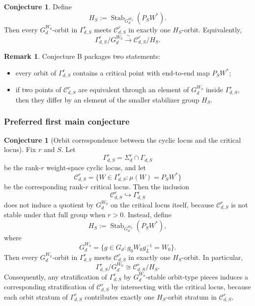 \documentclass{article}
\newcommand{\Stab}{\operatorname{Stab}}
\theoremstyle{definition}
\newtheorem{remark}[theorem]{Remark}
\newtheorem{conjecture}[theorem]{Conjecture}
\begin{document}
\begin{conjecture}
Define
\[
H_S:=\Stab_{G_d^{W_0}}(P_SW^\ast).
\]
Then every $G_d^{W_0}$-orbit in $\Gamma_{d,S}^r$ meets $\mathcal C_{d,S}^r$ in exactly one $H_S$-orbit. Equivalently,
\[
\Gamma_{d,S}^r / G_d^{W_0}
\xrightarrow{\ \sim\ }
\mathcal C_{d,S}^r / H_S.
\]
\end{conjecture}

\begin{remark}
Conjecture B packages two statements:
\begin{itemize}
\item every orbit of $\Gamma_{d,S}^r$ contains a critical point with end-to-end map $P_SW^\ast$;
\item if two points of $\mathcal C_{d,S}^r$ are equivalent through an element of $G_d^{W_0}$ inside $\Gamma_{d,S}^r$, then they differ by an element of the smaller stabilizer group $H_S$.
\end{itemize}
\end{remark}

\subsubsection*{Preferred first main conjecture}

\begin{conjecture}[Orbit correspondence between the cyclic locus and the critical locus]
Fix $r$ and $S$. Let
\[
\Gamma_{d,S}^r
=
\Sigma_d^r\cap \Gamma_{d,S}
\]
be the rank-$r$ weight-space cyclic locus, and let
\[
\mathcal C_{d,S}^r
=
\{W\in \Gamma_{d,S}^r : \mu(W)=P_SW^\ast\}
\]
be the corresponding rank-$r$ critical locus. Then the inclusion
\[
\mathcal C_{d,S}^r \hookrightarrow \Gamma_{d,S}^r
\]
does not induce a quotient by $G_d^{W_0}$ on the critical locus itself, because $\mathcal C_{d,S}^r$ is not stable under that full group when $r>0$. Instead, define
\[
H_S:=\Stab_{G_d^{W_0}}(P_SW^\ast),
\]
where
\[
G_d^{W_0}
=
\{g\in G_d : g_0W_0 g_L^{-1}=W_0\}.
\]
Then every $G_d^{W_0}$-orbit in $\Gamma_{d,S}^r$ meets $\mathcal C_{d,S}^r$ in exactly one $H_S$-orbit. In particular,
\[
\Gamma_{d,S}^r / G_d^{W_0}
\cong
\mathcal C_{d,S}^r / H_S.
\]
Consequently, any stratification of $\Gamma_{d,S}^r$ by $G_d^{W_0}$-stable orbit-type pieces induces a corresponding stratification of $\mathcal C_{d,S}^r$ by intersecting with the critical locus, because each orbit stratum of $\Gamma_{d,S}^r$ contributes exactly one $H_S$-orbit stratum in $\mathcal C_{d,S}^r$.
\end{conjecture}
\end{document}
